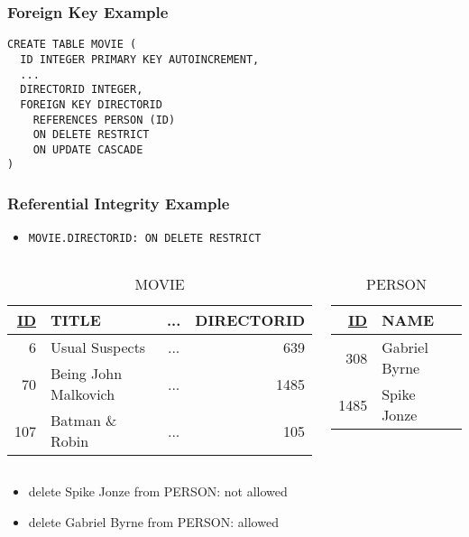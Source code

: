 \documentclass[dvipsnames]{beamer}
\theoremstyle{plain}
\begin{document}
\begin{frame}[fragile]
  \frametitle{Foreign Key Example}

  \begin{lstlisting}
CREATE TABLE MOVIE (
  ID INTEGER PRIMARY KEY AUTOINCREMENT,
  ...
  DIRECTORID INTEGER,
  FOREIGN KEY DIRECTORID
    REFERENCES PERSON (ID)
    ON DELETE RESTRICT
    ON UPDATE CASCADE
)
  \end{lstlisting}
\end{frame}

\begin{frame}
  \frametitle{Referential Integrity Example}

  \begin{itemize}
    \item \lstinline!MOVIE.DIRECTORID: ON DELETE RESTRICT!
  \end{itemize}

  \begin{columns}
    \begin{tiny}
    \begin{table}
      \caption{MOVIE}
      \begin{tabular}{|r|l|c|r|}\hline
\underline{ID} & TITLE             & ... & DIRECTORID\\[2pt]\hline\hline
          6 & Usual Suspects       & ... &        639\\\hline
         70 & Being John Malkovich & ... &       1485\\\hline
        107 & Batman \& Robin      & ... &        105\\\hline
      \end{tabular}
    \end{table}
    \end{tiny}

    \begin{tiny}
    \begin{table}
      \caption{PERSON}
      \begin{tabular}{|r|l|}\hline
\underline{ID} & NAME\\[2pt]\hline\hline
           308 & Gabriel Byrne\\\hline
          1485 & Spike Jonze  \\\hline
      \end{tabular}
    \end{table}
    \end{tiny}
  \end{columns}

  \begin{itemize}
    \item delete Spike Jonze from PERSON: not allowed
    \pause
    \item delete Gabriel Byrne from PERSON: allowed
  \end{itemize}
\end{frame}
\end{document}

